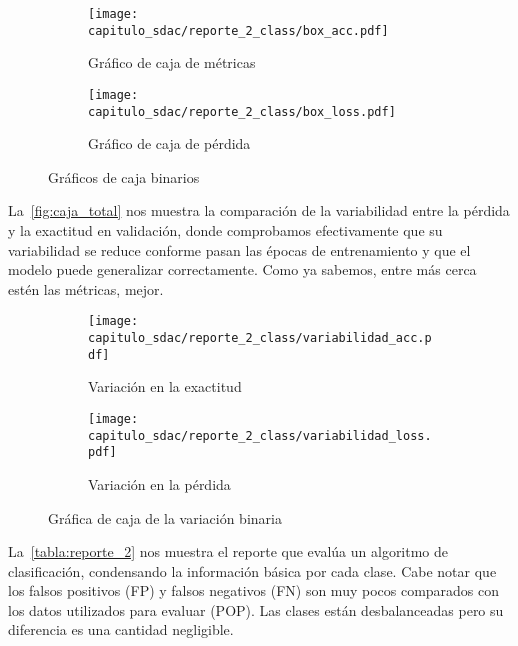 \begin{figure}[H]
    \centering
    \begin{subfigure}[b]{0.6\textwidth}
        \centering
        \texttt{[image: capitulo\_sdac/reporte\_2\_class/box\_acc.pdf]}
        \caption{Gráfico de caja de métricas}\label{fig:caja_acc2} 
    \end{subfigure}

    \begin{subfigure}[b]{0.6\textwidth}
        \centering
        \texttt{[image: capitulo\_sdac/reporte\_2\_class/box\_loss.pdf]}
        \caption{Gráfico de caja de pérdida}\label{fig:caja_loss2}
    \end{subfigure}
    \caption{Gráficos de caja binarios}\label{fig:caja_total2}
\end{figure}

La~\autoref{fig:caja_total} nos muestra la comparación de la variabilidad entre
la pérdida y la exactitud en validación, donde comprobamos efectivamente que su
variabilidad se reduce conforme pasan las épocas de entrenamiento y que el
modelo puede generalizar correctamente. Como ya sabemos, entre más cerca estén
las métricas, mejor.

\begin{figure}[H]
    \centering
    \begin{subfigure}[b]{0.6\textwidth}
        \centering
        \texttt{[image: capitulo\_sdac/reporte\_2\_class/variabilidad\_acc.pdf]}
        \caption{Variación en la exactitud}\label{fig:caja_acc} 
    \end{subfigure}

    \begin{subfigure}[b]{0.6\textwidth}
        \centering
        \texttt{[image: capitulo\_sdac/reporte\_2\_class/variabilidad\_loss.pdf]}
        \caption{Variación en la pérdida}\label{fig:caja_loss}
    \end{subfigure}
    \caption{Gráfica de caja de la variación binaria}\label{fig:caja_total}
\end{figure}

La~\autoref{tabla:reporte_2} nos muestra el reporte que evalúa un algoritmo de
clasificación, condensando la información básica por cada clase. Cabe notar que
los falsos positivos (FP) y falsos negativos (FN) son muy pocos comparados con
los datos utilizados para evaluar (POP). Las clases están desbalanceadas pero su
diferencia es una cantidad negligible. 

